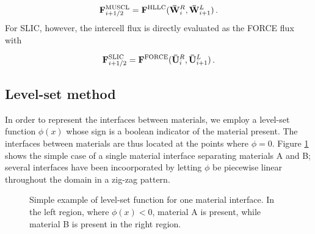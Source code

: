 \documentclass[final,3p,twocolumn]{elsarticle}
\begin{document}
\begin{equation}
    \label{eq:MUSCL}
    {\bf F}_{i+1/2}^{\rm MUSCL} = {\bf F}^{\rm HLLC}({\bf
    \bar{W}}_i^R, {\bf \bar{W}}_{i+1}^L) \,.
\end{equation}
%
For SLIC, however, the intercell flux is directly evaluated as the FORCE flux with 

\begin{equation}
    \label{eq:SLIC}
    {\bf F}_{i+1/2}^{\rm SLIC} = {\bf F}^{\rm FORCE}({\bf
    \bar{U}}_i^R, {\bf \bar{U}}_{i+1}^L) \,.
\end{equation}
\subsection{Level-set method}
\label{subsec:levelset}

In order to represent the interfaces between materials, we employ a level-set
function $\phi(x)$ whose sign is a boolean indicator of the material present. The
interfaces between materials are thus located at the points where $\phi=0$.
Figure \ref{fig:levelSet} shows the simple case of a single material interface
separating materials A and B; several interfaces have been incoorporated by
letting $\phi$ be piecewise linear throughout the domain in a zig-zag
pattern. 

\begin{figure}[htb]
    \centering
    \caption{Simple example of level-set function for one material interface.
    In the left region, where $\phi(x)<0$, material A is present,
    while material B is present in the right region. }
    \label{fig:levelSet}
\end{figure}
\end{document}
